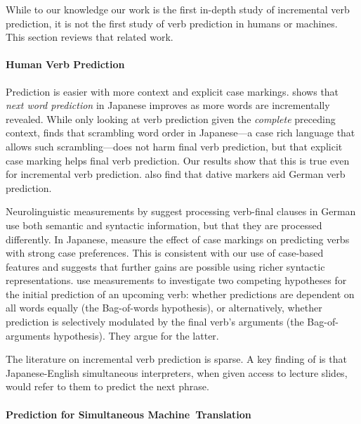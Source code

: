 
While to our knowledge our work is the first in-depth study of
incremental verb prediction, it is not the first study of verb
prediction in humans or machines.  This section reviews that related
work.

\paragraph{Human Verb Prediction}

Prediction is easier with more context and explicit case markings.
 shows that \emph{next word prediction} in
Japanese improves as more words are incrementally revealed.  While
only looking at verb prediction given the \emph{complete} preceding
context,  finds that scrambling word
order in Japanese---a case rich language that allows such
scrambling---does not harm final verb prediction, but that explicit
case marking helps final verb prediction. Our results show that this
is true even for incremental verb
prediction.  also find that dative
markers aid German verb prediction.

Neurolinguistic measurements by  suggest
processing verb-final clauses in German use both semantic and
syntactic information, but that they are processed differently.  In
Japanese,  measure the effect of case markings
on predicting verbs with strong case preferences.  This is consistent
with our use of case-based features and suggests that further gains
are possible using richer syntactic
representations.  use  measurements to
investigate two competing hypotheses for the initial prediction of an
upcoming verb: whether predictions are dependent on all words equally
(the Bag-of-words hypothesis), or alternatively, whether prediction is
selectively modulated by the final verb's arguments (the
Bag-of-arguments hypothesis).  They argue for the latter.

The literature on incremental verb prediction is sparse. A key finding
of  is that Japanese-English simultaneous
interpreters, when given access to lecture slides, would refer to them
to predict the next phrase.

\paragraph{Prediction for Simultaneous Machine~Translation}

